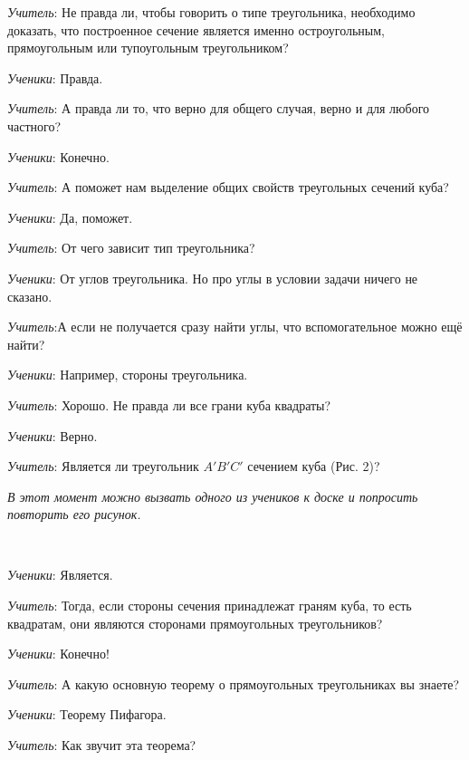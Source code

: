 \documentclass[a4paper,14pt,russian]{extreport}
\newcommand{\capt}[1]{%
    \\[8pt]
    \text{Рис. #1}
}
\begin{document}
\textit{Учитель}: Не правда ли, чтобы говорить о типе треугольника, необходимо доказать, что построенное сечение является именно остроугольным, прямоугольным или тупоугольным треугольником?

\textit{Ученики}: Правда.

\textit{Учитель}: А правда ли то, что верно для общего случая, верно и для любого частного?

\textit{Ученики}: Конечно.

\textit{Учитель}: А поможет нам выделение общих свойств треугольных сечений куба?

\textit{Ученики}: Да, поможет.

\textit{Учитель}: От чего зависит тип треугольника?

\textit{Ученики}: От углов треугольника. Но про углы в условии задачи ничего не сказано.

\textit{Учитель}:А если не получается сразу найти углы, что вспомогательное можно ещё найти?

\textit{Ученики}: Например, стороны треугольника.

\textit{Учитель}: Хорошо. Не правда ли все грани куба квадраты?

\textit{Ученики}: Верно.

\textit{Учитель}: Является ли треугольник $A'B'C'$ сечением куба (Рис. 2)? 

\textit{В этот момент можно вызвать одного из учеников к доске и попросить повторить его рисунок.}

 \begin{center}
    \begin{minipage}{0.3\textwidth}
        \centering
    \end{minipage}
    \capt{2}
\end{center}

\textit{Ученики}: Является.

\textit{Учитель}: Тогда, если стороны сечения принадлежат граням куба, то есть квадратам, они являются сторонами прямоугольных треугольников?

\textit{Ученики}: Конечно!

\textit{Учитель}: А какую основную теорему о прямоугольных треугольниках вы знаете?

\textit{Ученики}: Теорему Пифагора.

\textit{Учитель}: Как звучит эта теорема?
\end{document}
